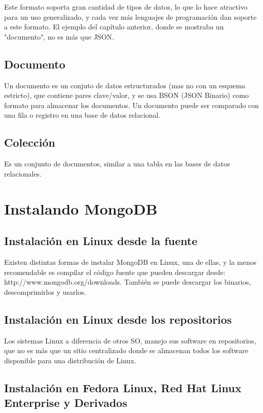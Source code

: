 Este formato soporta gran cantidad de tipos de datos, lo que lo hace atractivo para un uso generalizado, y cada vez m\'as lenguajes de programaci\'on dan soporte a este formato. El ejemplo del cap\'itulo anterior, donde se mostraba un "documento", no es m\'as que JSON.

\subsection{Documento}

Un documento es un conjuto de datos estructurados (mas no con un esquema estricto), que contiene pares clave/valor, y se usa BSON (JSON Binario) como formato para almacenar los documentos. Un documento puede ser comparado con una fila o registro en una base de datos relacional.

\subsection{Colecci\'on}

Es un conjunto de documentos, similar a una tabla en las bases de datos relacionales.

\section{Instalando MongoDB}

\subsection{Instalaci\'on en Linux desde la fuente}

Existen distintas formas de instalar MongoDB en Linux, una de ellas, y la menos recomendable es compilar el c\'odigo fuente que pueden descargar desde: http://www.mongodb.org/downloads. Tambi\'en se puede descargar los binarios, descomprimirlos y usarlos.

\subsection{Instalaci\'on en Linux desde los repositorios}

Los sistemas Linux a diferencia de otros SO, manejo sus software en repositorios, que no es m\'as que un sitio centralizado donde se almacenan todos los software disponible para una distribuci\'on de Linux.

\subsection*{Instalaci\'on en Fedora Linux, Red Hat Linux Enterprise y Derivados}

